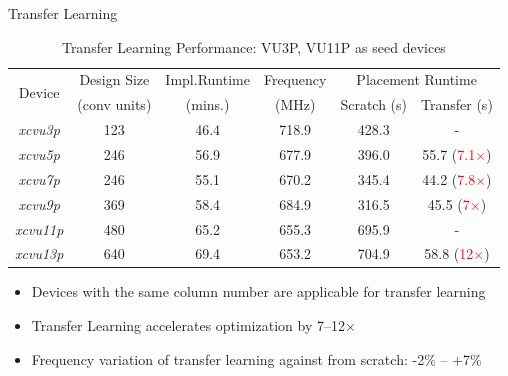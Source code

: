 \documentclass[10pt]{beamer}
\begin{document}
\begin{frame}{Transfer Learning}

  \begin{table}[h!]
    \caption{Transfer Learning Performance: VU3P, VU11P as seed devices}
    \label{table:port}
    \centering
    \begin{adjustbox}{width=\columnwidth,center}
    \begin{tabular}{c|c c c c c}
      \toprule
  \multirow{2}{*}{Device}     & Design Size 		& Impl.Runtime 		& Frequency 	 & \multicolumn{2}{c}{Placement Runtime}    			\\ \cline{5-6}
                                 & (conv units)		& (mins.)				& (MHz)			 & 	Scratch (s)			& 	Transfer (s)				\\
      \midrule
      \emph{xcvu3p}  			& 123				&	46.4			& 718.9			 & 428.3				& - 							\\
      \emph{xcvu5p}  			& 246				&   56.9				& 677.9	 		 & 396.0				& 55.7 	(\textcolor{red}{7.1$\times$})							\\
      \emph{xcvu7p}  			& 246			    &   55.1				& 670.2	 		 & 345.4				& 44.2 	(\textcolor{red}{7.8$\times$})							\\
      \emph{xcvu9p}  			& 369	   			&   58.4				& 684.9	 		 & 316.5				& 45.5 	(\textcolor{red}{7$\times$})							\\ 
      \midrule
      \emph{xcvu11p} 			& 480	      	    &	65.2          	& 655.3	 		 & 695.9				& -								\\	
      \emph{xcvu13p} 			& 640        	    & 	69.4   			& 653.2	 		 & 704.9				& 58.8	(\textcolor{red}{12$\times$})			\\
      \bottomrule
    \end{tabular}
    \vspace{-0.1in}
    \end{adjustbox}
  \end{table}

  {\fontsize{8}{12}\selectfont
  \begin{itemize}
    \item Devices with the same \alert{column number} are applicable for transfer learning
    \item Transfer Learning accelerates optimization by \alert{7--12$\times$}
    \item Frequency variation of transfer learning against from scratch: \alert{-2\% -- +7\%}
  \end{itemize}
  }
  
\end{frame}
\end{document}

